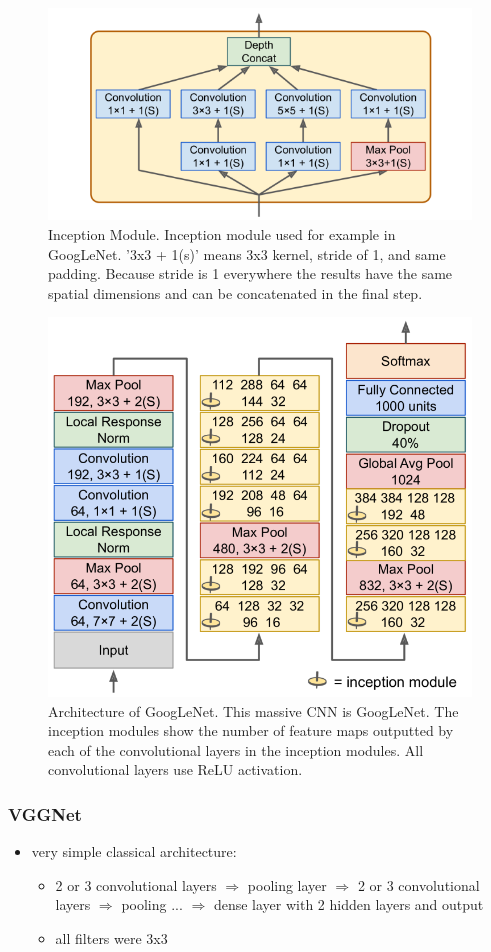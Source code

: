 \documentclass[12pt,a4paper]{article}
\begin{document}
\begin{figure}
  \centering
  \includegraphics[width=.5\linewidth]{Images/inception_module.png}
  \caption[Inception Module]{Inception Module. Inception module used for example in GoogLeNet. '3x3 + 1(s)' means 3x3 kernel, stride of 1, and same padding. Because stride is 1 everywhere the results have the same spatial dimensions and can be concatenated in the final step.}
  \label{fig:inception_module}
\end{figure}
\begin{figure}
  \centering  
  \includegraphics[width=.5\linewidth]{Images/GoogLeNet.png}
  \caption[Architecture of GoogLeNet]{Architecture of GoogLeNet. This massive CNN is GoogLeNet. The inception modules show the number of feature maps outputted by each of the convolutional layers in the inception modules. All convolutional layers use ReLU activation.}
  \label{fig:GoogLeNet}
\end{figure}

\subsubsection{VGGNet} %
\label{ssub:vggnet}
\begin{itemize}
  \item very simple classical architecture:
  \begin{itemize}
    \item 2 or 3 convolutional layers $\Longrightarrow$ pooling layer $\Longrightarrow$ 2 or 3 convolutional layers $\Longrightarrow$ pooling ... $\Longrightarrow$ dense layer with 2 hidden layers and output
    \item all filters were 3x3
  \end{itemize}
\end{itemize}
\end{document}
